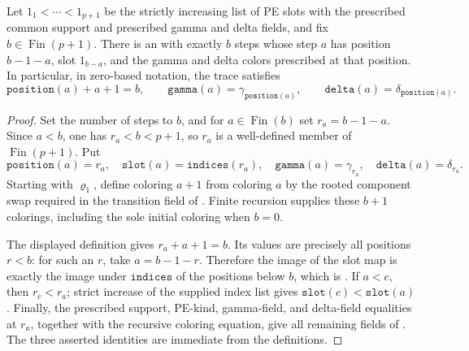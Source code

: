 \begin{helper}
Let \(1_1<\cdots<1_{p+1}\) be the strictly increasing list of PE slots
with the prescribed common support and prescribed gamma and delta fields, and
fix \(b\in\operatorname{Fin}(p+1)\).  There is an
 with exactly \(b\) steps whose step
\(a\) has position \(b-1-a\), slot \(1_{b-a}\), and the gamma and delta
colors prescribed at that position.  In particular, in zero-based notation,
the trace satisfies
\[
 \mathtt{position}(a)+a+1=b,
 \qquad
 \mathtt{gamma}(a)=\gamma_{\mathtt{position}(a)},
 \qquad
 \mathtt{delta}(a)=\delta_{\mathtt{position}(a)}.
\]
\end{helper}
\begin{proof}
Set the number of steps to \(b\), and for \(a\in\operatorname{Fin}(b)\)
set \(r_a=b-1-a\).  Since \(a<b\), one has \(r_a<b<p+1\), so \(r_a\)
is a well-defined member of \(\operatorname{Fin}(p+1)\).  Put
\[
 \mathtt{position}(a)=r_a,\quad
 \mathtt{slot}(a)=\mathtt{indices}(r_a),\quad
 \mathtt{gamma}(a)=\gamma_{r_a},\quad
 \mathtt{delta}(a)=\delta_{r_a}.
\]
Starting with \(\varrho_1\), define coloring \(a+1\) from coloring \(a\)
by the rooted component swap required in the transition field of
.  Finite recursion supplies these
\(b+1\) colorings, including the sole initial coloring when \(b=0\).

The displayed definition gives \(r_a+a+1=b\).  Its values are precisely all
positions \(r<b\): for such an \(r\), take \(a=b-1-r\).  Therefore the image
of the slot map is exactly the image under \(\mathtt{indices}\) of the
positions below \(b\), which is
.  If \(a<c\), then
\(r_c<r_a\); strict increase of the supplied index list gives
\(\mathtt{slot}(c)<\mathtt{slot}(a)\).  Finally, the prescribed support,
PE-kind, gamma-field, and delta-field equalities at \(r_a\), together with
the recursive coloring equation, give all remaining fields of
.  The three asserted identities are
immediate from the definitions.
\end{proof}
